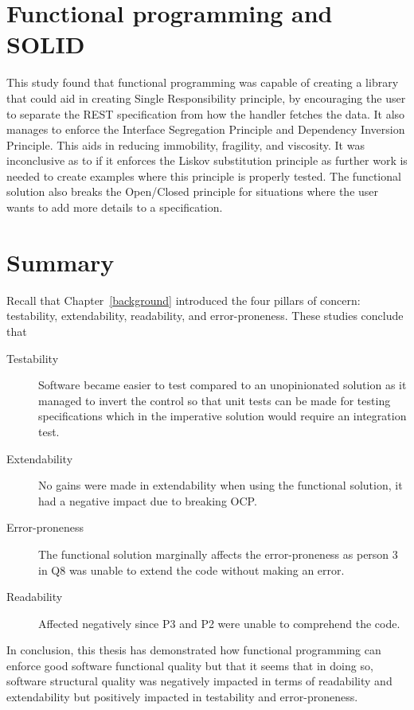 \section{Functional programming and SOLID}

This study found that functional programming was capable of creating a library
that could aid in creating Single Responsibility principle, by encouraging the
user to separate the REST specification from how the handler fetches the data.
It also manages to enforce the Interface Segregation Principle and Dependency
Inversion Principle. This aids in reducing immobility, fragility, and viscosity.
It was inconclusive as to if it enforces the Liskov substitution principle as
further work is needed to create examples where this principle is properly
tested. The functional solution also breaks the Open/Closed principle for
situations where the user wants to add more details to a specification.

\section{Summary}

Recall that Chapter~\ref{background} introduced the four pillars of concern:
testability, extendability, readability, and error-proneness. These studies
conclude that

\begin{description}
    \item[Testability] Software became easier to test compared to an unopinionated
        solution as it managed to invert the control so that unit tests can be
        made for testing specifications which in the imperative solution would
        require an integration test.
	\item[Extendability] No gains were made in extendability when using the 
	functional solution, it had a negative impact due to breaking OCP.
    \item[Error-proneness] The functional solution marginally affects the
        error-proneness as person 3 in Q8 was unable to extend the
        code without making an error.
    \item[Readability] Affected negatively since P3 and P2 were unable to
        comprehend the code.
\end{description}

In conclusion, this thesis has demonstrated how functional programming can
enforce good software functional quality but that it seems that in doing so,
software structural quality was negatively impacted in terms of readability and
extendability but positively impacted in testability and error-proneness. 

